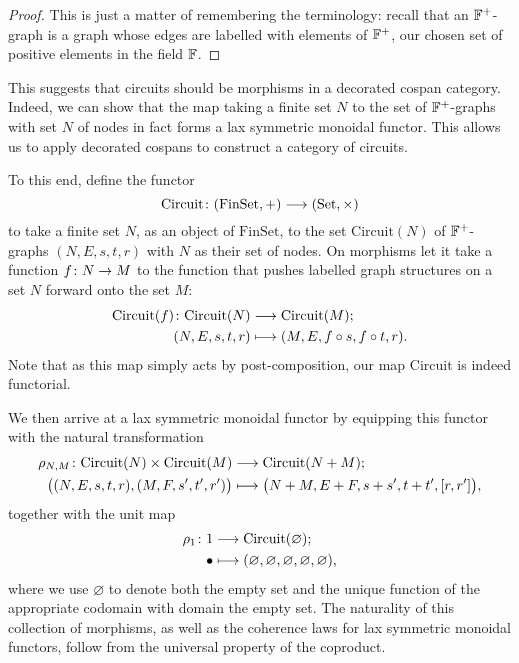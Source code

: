 \begin{proof}
This is just a matter of remembering the terminology: recall that an ${\mathbb F}^+$-graph
is a graph whose edges are labelled with elements of ${\mathbb F}^+$, our chosen set of positive
elements in the field ${\mathbb F}$.
\end{proof}

This suggests that circuits should be morphisms in a decorated  cospan category. Indeed, we can show that the map taking a finite set $N$ to the set of ${\mathbb F}^+$-graphs with
set $N$ of nodes in fact forms a lax symmetric monoidal functor. This allows us to apply
decorated cospans to construct a category of circuits.

To this end, define the functor
\[
  \mathrm{Circuit}{\colon} (\mathrm{FinSet},+) \longrightarrow (\mathrm{Set},\times)
\]
to take a finite set $N$, as an object of $\mathrm{FinSet}$, to the set
$\mathrm{Circuit}(N)$ of ${\mathbb F}^+$-graphs $(N,E,s,t,r)$ with $N$ as their
set of nodes. On
morphisms let it take a function $f{\colon} N \to M$ to the function that pushes
labelled graph structures on a set $N$ forward onto the set $M$:
\begin{align*}
  \mathrm{Circuit}(f){\colon} \mathrm{Circuit}(N) &\longrightarrow
  \mathrm{Circuit}(M); \\
  (N,E,s,t,r) &\longmapsto (M,E,f \circ s, f \circ t, r).
\end{align*}
Note that as this map simply acts by post-composition, our map
$\mathrm{Circuit}$ is indeed functorial.

We then arrive at a lax symmetric monoidal functor by equipping this functor with the
natural transformation 
\begin{align*}
  \rho_{N,M}{\colon} \mathrm{Circuit}(N) \times \mathrm{Circuit}(M)
  &\longrightarrow \mathrm{Circuit}(N+M); \\
  \big( (N,E,s,t,r), (M,F,s',t',r') \big) &\longmapsto
  \big(N+M,E+F,s+s',t+t',[r,r']\big),
\end{align*}
together with the unit map
\begin{align*}
  \rho_1{\colon} 1 &\longrightarrow \mathrm{Circuit}(\varnothing); \\
  \bullet &\longmapsto
  (\varnothing,\varnothing,\varnothing,\varnothing,\varnothing),
\end{align*}
where we use $\varnothing$ to denote both the empty set and the unique function
of the appropriate codomain with domain the empty set. The naturality of this
collection of morphisms, as well as the coherence laws for lax symmetric
monoidal functors, follow from the universal property of the coproduct. 

